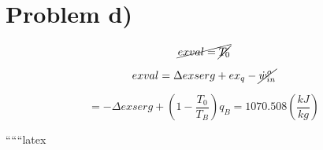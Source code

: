 \section*{Problem d)}

\[
\cancel{exval = \cancel{T_0}}
\]

\[
exval = \Delta exserg + ex_q - \cancel{\dot{w}_{in}^o}
\]

\[
= -\Delta exserg + \left( 1 - \frac{T_0}{T_B} \right) q_B = 1070.508 \left( \frac{kJ}{kg} \right)
\]

``````latex